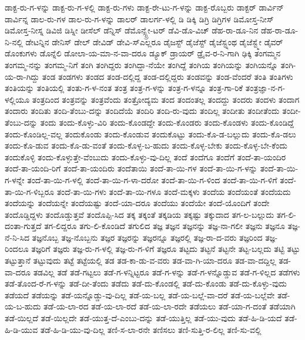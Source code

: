 {ಡಾಕ್ಟ-ರು-ಗ-ಳನ್ನು
ಡಾಕ್ಟ-ರು-ಗ-ಳಲ್ಲಿ
ಡಾಕ್ಟ-ರು-ಗಳು
ಡಾಕ್ಟ-ರೇ-ಟು-ಗ-ಳನ್ನು
ಡಾಕ್ಟ-ರೊಬ್ಬರು
ಡಾಕ್ಟರ್
ಡಾರ್ವಿನ್
ಡಾರ್ವಿನ್ನ
ಡಾಲ-ರು-ಗಳ
ಡಾಲ-ರು-ಗ-ಳನ್ನು
ಡಾಲರ್
ಡಾಲರ್ಗ-ಳಲ್ಲಿ
ಡಿ
ಡಿಕ್ಕಿ
ಡಿಗ್ರಿ
ಡಿಗ್ರಿಗಳ
ಡಿಮೋಸ್ತ-ನೀಸ್
ಡಿಮೋಸ್ತ-ನೀಸ್ನ
ಡಿವಿಜಿ
ಡಿಸ್ನೀ
ಡೀಸೆಲ್
ಡೆನ್ನಿಸ್
ಡೆಮೊನ್ಸ್ಟ್ರೇ-ಟರ್
ಡೆವಿ-ಡೊ-ವಿಚ್
ಡೆಹ-ರಾ-ಡೂ-ನಿನ
ಡೆಹ-ರಾ-ಡೂ-ನಿ-ನಲ್ಲಿ
ಡೇಟನ್ನಿನ
ಡೇನಿಸ್
ಡೇಲ್
ಡೇವಿಡ್
ಡೇವಿ-ಸ್ಎಲ್ಲರೂ
ಡೈಜಸ್ಟ್
ಡೈಜೆಸ್ಟ್
ಡೈಜೆಸ್ಟ್ನಂಥ
ಡೈಜೆಸ್ಟ್ಮೇ
ಡೈವರ್
ಡೊಂಕುಗಳು
ಡೊನ್ನೆಲಿ
ಡೋಲಾ-ಯ-ಮಾ-ನ-ವಾ-ದರೂ
ಡ್ಯೂಕ್
ಡ್ರಾಯರ್
ಡ್ರೈವ-ರ-ನಿ-ಗಾಗಿ
ಢಿಕ್ಕಿ
ತಂಗಮ್ಮನ
ತಂಗಮ್ಮ-ನನ್ನು
ತಂಗಮ್ಮ-ನಿಗೆ
ತಂಗಿ
ತಂಗಿದ್ದರು
ತಂಗಿದ್ದಾ-ನೆಯೇ
ತಂಗಿದ್ದೆ
ತಂಗಿಯ
ತಂಗಿಯನ್ನು
ತಂಗಿಯನ್ನೊ
ತಂಗಿ-ಯ-ರಾ-ಗಿದ್ದು
ತಂಡ
ತಂಡಗಳು
ತಂಡದ
ತಂಡ-ದಲ್ಲಿದ್ದ
ತಂಡ-ದಲ್ಲಿದ್ದರು
ತಂಡವನ್ನು
ತಂಡ-ವೆಂದರೆ
ತಂತಿ
ತಂತಿಗಳು
ತಂತಿಯನ್ನು
ತಂತಿಯಲ್ಲಿ
ತಂತು-ಗ-ಳ-ನಂತ
ತಂತ್ರ
ತಂತ್ರ-ಗ-ಳನ್ನು
ತಂತ್ರ-ಗ-ಳನ್ನೂ
ತಂತ್ರ-ಗಾ-ರಿಕೆ
ತಂತ್ರಜ್ಞಾ-ನ-ಗ-ಳಲ್ಲಿಯೂ
ತಂತ್ರದಿಂದ
ತಂತ್ರವನ್ನು
ತಂತ್ರವೆಂದು
ತಂತ್ರೋದ್ಯಮ
ತಂದ
ತಂದಂತಲ್ಲ
ತಂದದ್ದು
ತಂದರು
ತಂದಳು
ತಂದಾಗ
ತಂದಾರು
ತಂದಿತು
ತಂದಿ-ತೆಂಬು-ದನ್ನು
ತಂದಿದೆಯೆ
ತಂದಿರಿ
ತಂದಿ-ರು-ವುದು
ತಂದಿಲ್ಲ
ತಂದೀತು
ತಂದೀತೆಂದು
ತಂದೀ-ತೆಂಬು-ದನ್ನು
ತಂದು
ತಂದು-ಕೊಳ್ಳು-ವಿರಿ
ತಂದು-ಕೊಂಡದ್ದೇ
ತಂದು-ಕೊಂಡರು
ತಂದು-ಕೊಂಡಳು
ತಂದು-ಕೊಂಡಿದ್ದೆ
ತಂದು-ಕೊಂಡಿಲ್ಲ-ವಲ್ಲ
ತಂದುಕೊಂಡು
ತಂದು-ಕೊಂಡುವ
ತಂದುಕೊಟ್ಟು
ತಂದು-ಕೊ-ಡ-ಬಲ್ಲುದು
ತಂದು-ಕೊ-ಡಲು
ತಂದು-ಕೊ-ಡುವ
ತಂದು-ಕೊ-ಡು-ವಂತೆ
ತಂದು-ಕೊಳ್ಳ-ಬ-ಹುದು
ತಂದು-ಕೊಳ್ಳ-ಬೇಕು
ತಂದು-ಕೊಳ್ಳ-ಬೇ-ಕೆಂದು
ತಂದುಕೊಳ್ಳಿ
ತಂದು-ಕೊಳ್ಳುತ್ತೇ-ವೆಂಬುದು
ತಂದು-ಕೊಳ್ಳು-ವು-ದಿಲ್ಲ
ತಂದೆ
ತಂದೆಗೂ
ತಂದೆಗೆ
ತಂದೆ-ತಾ-ಯಂದಿರ
ತಂದೆ-ತಾ-ಯಂದಿ-ರಿಗೆ
ತಂದೆ-ತಾ-ಯಂದಿರು
ತಂದೆತಾಯಿ
ತಂದೆ-ತಾ-ಯಿ-ಗಳ
ತಂದೆ-ತಾ-ಯಿ-ಗ-ಳನ್ನು
ತಂದೆ-ತಾ-ಯಿ-ಗ-ಳನ್ನೇ
ತಂದೆ-ತಾ-ಯಿ-ಗ-ಳಲ್ಲಿ
ತಂದೆ-ತಾ-ಯಿ-ಗ-ಳಾ-ದರೋ
ತಂದೆ-ತಾ-ಯಿ-ಗ-ಳಿಂದ
ತಂದೆ-ತಾ-ಯಿ-ಗ-ಳಿಗೆ
ತಂದೆ-ತಾ-ಯಿ-ಗ-ಳಿಬ್ಬರೂ
ತಂದೆ-ತಾ-ಯಿ-ಗಳು
ತಂದೆ-ತಾ-ಯಿ-ಗಳೂ
ತಂದೆ-ಮಕ್ಕಳು
ತಂದೆಯ
ತಂದೆಯಂತೆ
ತಂದೆಯದು
ತಂದೆಯನ್ನು
ತಂದೆಯನ್ನೇ
ತಂದೆಯಷ್ಟು
ತಂದೆ-ಯಾ-ದರೂ
ತಂದೆಯು
ತಂದೆಯೇ
ತಂದೆ-ಯೊಂದಿಗೆ
ತಂದೇ
ತಂದೊಡ್ಡಿದ್ದಳು
ತಂದೊಡ್ಡುತ್ತವೆ
ತಂದೊಪ್ಪಿ-ಸಿದ
ತಕ್ಕ
ತಕ್ಕಂತೆ
ತಕ್ಕಡಿಯ
ತಕ್ಕಷ್ಟು
ತಕ್ಕುದಾದ
ತಗ-ಲ-ಬಲ್ಲುದು
ತಗ-ಲಿ-ದಂತಾ-ಗುತ್ತದೆ
ತಗ-ಲಿದ್ದರೂ
ತಗು-ಲಿ-ಕೊಂಡಿದೆ
ತಗುಲಿದ
ತಜ್ಞ
ತಜ್ಞನ
ತಜ್ಞನನ್ನು
ತಜ್ಞ-ನಾ-ಗಲೀ
ತಜ್ಞನು
ತಜ್ಞನೂ
ತಜ್ಞ-ನೆ-ನಿ-ಸಿದ
ತಜ್ಞನೊಬ್ಬ
ತಜ್ಞ-ನೊಬ್ಬನು
ತಜ್ಞರ
ತಜ್ಞರನ್ನು
ತಜ್ಞರನ್ನೂ
ತಜ್ಞರಲ್ಲಿ
ತಜ್ಞ-ರಾ-ದ-ವರು
ತಜ್ಞರಿಂದ
ತಜ್ಞ-ರಿಂದಲೂ
ತಜ್ಞರಿಗೆ
ತಜ್ಞರು
ತಜ್ಞ-ರು-ಗ-ಳಲ್ಲಿ
ತಜ್ಞ-ರು-ಗ-ಳಿಗೆ
ತಜ್ಞರೂ
ತಟ್ಟದು
ತಟ್ಟನೆ
ತಟ್ಟನೇ
ತಟ್ಟ-ಬಲ್ಲದು
ತಟ್ಟಿ
ತಟ್ಟು
ತಟ್ಟುತ್ತಾನೆ
ತಟ್ಟುವುದು
ತಟ್ಟೆ
ತಟ್ಟೆಯಲ್ಲಿ
ತಡ
ತಡ-ಕಾ-ಡು-ವ-ವರು
ತಡ-ವಾ-ಗಿ-ಯಾ-ದರೂ
ತಡ-ವಾ-ದದ್ದಿಲ್ಲ
ತಡ-ವಾ-ದರೂ
ತಡವಿಲ್ಲ
ತಡೆ
ತಡೆ-ಗಟ್ಟಲು
ತಡೆ-ಗ-ಳನ್ನಿಟ್ಟರೂ
ತಡೆ-ಗ-ಳನ್ನು
ತಡೆ-ಗ-ಳನ್ನೊಡ್ಡುವ
ತಡೆ-ಗ-ಳಿಲ್ಲದ
ತಡೆಗಳು
ತಡೆ-ತೊಂದ-ರೆ-ಗ-ಳನ್ನು
ತಡೆ-ದೀ-ತೆಂದು
ತಡೆದು
ತಡೆ-ದು-ಕೊಂಡಲ್ಲಿ
ತಡೆ-ದು-ಕೊಂಡು
ತಡೆ-ದು-ಕೊಳ್ಳು-ವುದು
ತಡೆಯದೆ
ತಡೆಯನ್ನು
ತಡೆ-ಯನ್ನೊಡ್ಡು-ವು-ದಿಲ್ಲ
ತಡೆ-ಯ-ಬಲ್ಲ
ತಡೆ-ಯ-ಬಲ್ಲೆ-ವಾ-ದರೆ
ತಡೆ-ಯ-ಬಲ್ಲೆವೇ
ತಡೆ-ಯ-ಬ-ಹುದು
ತಡೆ-ಯ-ಲಾ-ರದ
ತಡೆ-ಯ-ಲಾ-ರದೆ
ತಡೆ-ಯ-ಲಾ-ರದೇ
ತಡೆಯಲು
ತಡೆ-ಯಾ-ಗ-ದಂತೆ
ತಡೆಯಾಗಿ
ತಡೆ-ಯಿಲ್ಲದೆ
ತಡೆ-ಯಿಲ್ಲದೇ
ತಡೆ-ಯುತ್ತ-ದೆ-ಎಂಬು-ದನ್ನು
ತಡೆ-ಯುತ್ತಿಲ್ಲ
ತಡೆ-ಯು-ವುದು
ತಡೆ-ಹಿ-ಡಿ-ಯದೆ
ತಡೆ-ಹಿ-ಡಿ-ಯುವ
ತಡೆ-ಹಿ-ಡಿ-ಯು-ವು-ದಿಲ್ಲ
ತಣಿ-ಸ-ಲಾ-ರನೇ
ತಣಿಸಲು
ತಣಿ-ಸುತ್ತಿ-ರ-ಲಿಲ್ಲ
ತಣಿ-ಸು-ವಲ್ಲಿ
}
